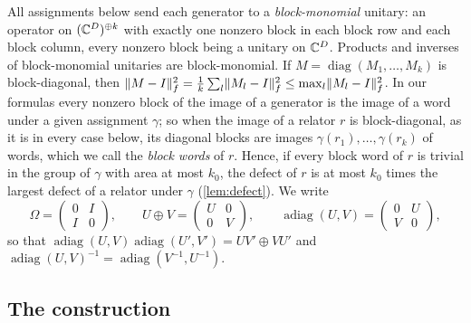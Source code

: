 All assignments below send each generator to a \emph{block-monomial} unitary: an operator on $(\mathbb C^D)^{\oplus k}$ with exactly one nonzero
block in each block row and each block column, every nonzero block being a unitary on $\mathbb C^D$. Products and inverses of block-monomial
unitaries are block-monomial. If $M=\operatorname{diag}(M_1,\dots,M_k)$ is block-diagonal, then
$\lVert M-I\rVert_f^2=\frac1k\sum_l\lVert M_l-I\rVert_f^2\le\max_l\lVert M_l-I\rVert_f^2$. In our formulas every nonzero block of the image of a generator is the image of
a word under a given assignment $\gamma$; so when the image of a relator $r$ is block-diagonal, as it is in every case below, its diagonal
blocks are images $\gamma(r_1),\dots,\gamma(r_k)$ of words, which we call the \emph{block words} of $r$. Hence, if every block word of $r$
is trivial in the group of $\gamma$ with area at most $k_0$, the defect of $r$ is at most $k_0$ times the largest defect of a relator under
$\gamma$ (\cref{lem:defect}). We write
\[
\Omega=\begin{pmatrix}0&I\\ I&0\end{pmatrix},\qquad U\oplus V=\begin{pmatrix}U&0\\ 0&V\end{pmatrix},\qquad
\operatorname{adiag}(U,V)=\begin{pmatrix}0&U\\ V&0\end{pmatrix},
\]
so that $\operatorname{adiag}(U,V)\operatorname{adiag}(U',V')=UV'\oplus VU'$ and $\operatorname{adiag}(U,V)^{-1}=\operatorname{adiag}(V^{-1},U^{-1})$.

\subsection{The construction}\label{gadget:construction}

